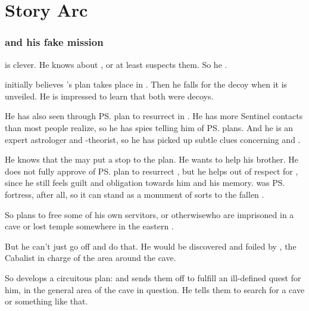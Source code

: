 \section{\Shilred{} Story Arc}





\subsubsection[Ishnaruchaefir and his fake mission]{\Ishnaruchaefir{} and his fake mission}
\Ishnaruchaefir{} is clever. He knows about , or at least suspects them. So he . 

\Ishnaruchaefir initially believes \Secherdamon's plan takes place in \Malcur.
Then he falls for the \Forclin decoy when it is unveiled. 
He is impressed to learn that both were decoys. 

He has also seen through \ps{\Secherdamon} plan to resurrect \Nithdornazsh{} in \Malcur. 
He has more Sentinel contacts than most people realize, so he has spies telling him of \ps{\Secherdamon} plans. 
And he is an expert astrologer and \matrix-theorist, so he has picked up subtle clues concerning \Nithdornazsh{} and \Malcur. 

He knows that the \noggyaleth{} may put a stop to the plan. 
He wants to help his brother.
He does not fully approve of \ps{\Secherdamon} plan to resurrect \Nithdornazsh, but he helps out of respect for , since he still feels guilt and obligation towards him and his memory. 
\Nithd{} was \ps{\Nexagglachel}{} fortress, after all, so it can stand as a monument of sorts to the fallen \dragonking.

So \Ishnaruchaefir{} plans to free some of his own servitors\dash\pdaemons, \dragons{} or otherwise\dash who are imprisoned in a cave or lost temple somewhere in the eastern \PelidorContinent. 

But he can't just go off and do that. He would be discovered and foiled by , the Cabalist in charge of the area around the cave. 

So \Ishnaruchaefir{} develops a circuitous plan: 
 and sends them off to fulfill an ill-defined quest for him, in the general area of the cave in question. He tells them to search for a cave or something like that. 

